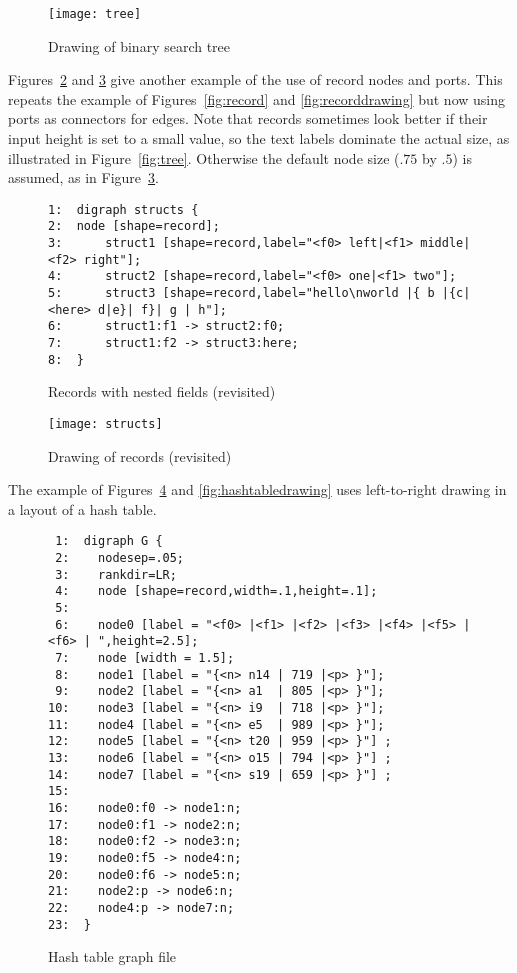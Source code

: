 \documentclass[11pt]{article}
\begin{document}
{\begin{figure}[p]
	\centerline {
		\texttt{[image: tree]}
	}
    \caption{Drawing of binary search tree}
    \label{fig:treedrawing}
\end{figure}

Figures~\ref{fig:structs} and \ref{fig:structdrawing}
give another example of the use of record nodes and ports.
This repeats the example of 
Figures~\ref{fig:record} and \ref{fig:recorddrawing}
but now using ports as connectors for edges.
Note that records sometimes look better if their input height is set 
to a small value, so the text labels dominate the actual size, as
illustrated in Figure~\ref{fig:tree}.  Otherwise the default node
size ($.75$ by $.5$) is assumed, as in Figure~\ref{fig:structdrawing}.
\begin{figure}[p]\footnotesize
\begin{verbatim}
1:  digraph structs {
2:  node [shape=record];
3:      struct1 [shape=record,label="<f0> left|<f1> middle|<f2> right"];
4:      struct2 [shape=record,label="<f0> one|<f1> two"];
5:      struct3 [shape=record,label="hello\nworld |{ b |{c|<here> d|e}| f}| g | h"];
6:      struct1:f1 -> struct2:f0;
7:      struct1:f2 -> struct3:here;
8:  }
\end{verbatim}
\caption{Records with nested fields (revisited)}
\label{fig:structs}
\end{figure}
\begin{figure}[p]
	\centerline {
		\texttt{[image: structs]}
	}
    \caption{Drawing of records (revisited)}
    \label{fig:structdrawing}
\end{figure}
The example of Figures~\ref{fig:hashtable} and \ref{fig:hashtabledrawing}
uses left-to-right drawing in a layout of a hash table.
\begin{figure}[p]\footnotesize
\begin{verbatim}
 1:  digraph G {
 2:    nodesep=.05;
 3:    rankdir=LR;
 4:    node [shape=record,width=.1,height=.1];
 5:  
 6:    node0 [label = "<f0> |<f1> |<f2> |<f3> |<f4> |<f5> |<f6> | ",height=2.5];
 7:    node [width = 1.5];
 8:    node1 [label = "{<n> n14 | 719 |<p> }"];
 9:    node2 [label = "{<n> a1  | 805 |<p> }"];
10:    node3 [label = "{<n> i9  | 718 |<p> }"];
11:    node4 [label = "{<n> e5  | 989 |<p> }"];
12:    node5 [label = "{<n> t20 | 959 |<p> }"] ;
13:    node6 [label = "{<n> o15 | 794 |<p> }"] ;
14:    node7 [label = "{<n> s19 | 659 |<p> }"] ;
15:  
16:    node0:f0 -> node1:n;
17:    node0:f1 -> node2:n;
18:    node0:f2 -> node3:n;
19:    node0:f5 -> node4:n;
20:    node0:f6 -> node5:n;
21:    node2:p -> node6:n;
22:    node4:p -> node7:n;
23:  }
\end{verbatim}\vspace*{-.25in}
\caption{Hash table graph file}
\label{fig:hashtable}
\end{figure}

}
\end{document}
